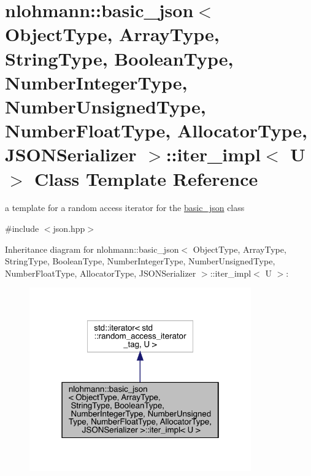 \hypertarget{classnlohmann_1_1basic__json_1_1iter__impl}{}\section{nlohmann\+::basic\+\_\+json$<$ Object\+Type, Array\+Type, String\+Type, Boolean\+Type, Number\+Integer\+Type, Number\+Unsigned\+Type, Number\+Float\+Type, Allocator\+Type, J\+S\+O\+N\+Serializer $>$\+::iter\+\_\+impl$<$ U $>$ Class Template Reference}
\label{classnlohmann_1_1basic__json_1_1iter__impl}


a template for a random access iterator for the \mbox{\hyperlink{classnlohmann_1_1basic__json}{basic\+\_\+json}} class  




{\ttfamily \#include $<$json.\+hpp$>$}



Inheritance diagram for nlohmann\+::basic\+\_\+json$<$ Object\+Type, Array\+Type, String\+Type, Boolean\+Type, Number\+Integer\+Type, Number\+Unsigned\+Type, Number\+Float\+Type, Allocator\+Type, J\+S\+O\+N\+Serializer $>$\+::iter\+\_\+impl$<$ U $>$\+:
\nopagebreak
\begin{figure}[H]
\begin{center}
\leavevmode
\includegraphics[width=271pt]{classnlohmann_1_1basic__json_1_1iter__impl__inherit__graph}
\end{center}
\end{figure}


